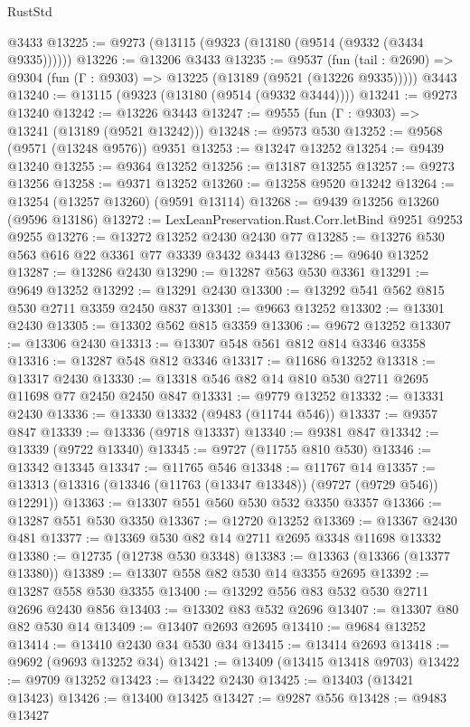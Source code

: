 \begin{lexlean}{RustStd}
\begin{coremodule}
{\begin{coremodule}
{{{{{{{{{{{{{{{{{{{{{{{{{{{{{{{{{{{{{{{{{{{{{{{{{{{{{{{    @3433
@13225 := @9273 (@13115 (@9323 (@13180 (@9514 (@9332 (@3434 @9335))))))
@13226 := @13206 @3433
@13235 := @9537
    (fun (tail : @2690) => @9304 (fun (Γ : @9303) => @13225 (@13189 (@9521 (@13226 @9335)))))
    @3443
@13240 := @13115 (@9323 (@13180 (@9514 (@9332 @3444))))
@13241 := @9273 @13240
@13242 := @13226 @3443
@13247 := @9555 (fun (Γ : @9303) => @13241 (@13189 (@9521 @13242)))
@13248 := @9573 @530
@13252 := @9568 (@9571 (@13248 @9576)) @9351
@13253 := @13247 @13252
@13254 := @9439 @13240
@13255 := @9364 @13252
@13256 := @13187 @13255
@13257 := @9273 @13256
@13258 := @9371 @13252
@13260 := @13258 @9520 @13242
@13264 := @13254 (@13257 @13260) (@9591 @13114)
@13268 := @9439 @13256 @13260 (@9596 @13186)
@13272 := LexLeanPreservation.Rust.Corr.letBind @9251 @9253 @9255
@13276 := @13272 @13252 @2430 @2430 @77
@13285 := @13276 @530 @563 @616 @22 @3361 @77 @3339 @3432 @3443
@13286 := @9640 @13252
@13287 := @13286 @2430
@13290 := @13287 @563 @530 @3361
@13291 := @9649 @13252
@13292 := @13291 @2430
@13300 := @13292 @541 @562 @815 @530 @2711 @3359 @2450 @837
@13301 := @9663 @13252
@13302 := @13301 @2430
@13305 := @13302 @562 @815 @3359
@13306 := @9672 @13252
@13307 := @13306 @2430
@13313 := @13307 @548 @561 @812 @814 @3346 @3358
@13316 := @13287 @548 @812 @3346
@13317 := @11686 @13252
@13318 := @13317 @2430
@13330 := @13318 @546 @82 @14 @810 @530 @2711 @2695 @11698 @77 @2450 @2450 @847
@13331 := @9779 @13252
@13332 := @13331 @2430
@13336 := @13330 @13332 (@9483 (@11744 @546))
@13337 := @9357 @847
@13339 := @13336 (@9718 @13337)
@13340 := @9381 @847
@13342 := @13339 (@9722 @13340)
@13345 := @9727 (@11755 @810 @530)
@13346 := @13342 @13345
@13347 := @11765 @546
@13348 := @11767 @14
@13357 := @13313 (@13316 (@13346 (@11763 (@13347 @13348)) (@9727 (@9729 @546)) @12291))
@13363 := @13307 @551 @560 @530 @532 @3350 @3357
@13366 := @13287 @551 @530 @3350
@13367 := @12720 @13252
@13369 := @13367 @2430 @481
@13377 := @13369 @530 @82 @14 @2711 @2695 @3348 @11698 @13332
@13380 := @12735 (@12738 @530 @3348)
@13383 := @13363 (@13366 (@13377 @13380))
@13389 := @13307 @558 @82 @530 @14 @3355 @2695
@13392 := @13287 @558 @530 @3355
@13400 := @13292 @556 @83 @532 @530 @2711 @2696 @2430 @856
@13403 := @13302 @83 @532 @2696
@13407 := @13307 @80 @82 @530 @14
@13409 := @13407 @2693 @2695
@13410 := @9684 @13252
@13414 := @13410 @2430 @34 @530 @34
@13415 := @13414 @2693
@13418 := @9692 (@9693 @13252 @34)
@13421 := @13409 (@13415 @13418 @9703)
@13422 := @9709 @13252
@13423 := @13422 @2430
@13425 := @13403 (@13421 @13423)
@13426 := @13400 @13425
@13427 := @9287 @556
@13428 := @9483 @13427
}}}}}}}}}}}}}}}}}}}}}}}}}}}}}}}}}}}}}}}}}}}}}}}}}}}}}}}
\end{coremodule}}
\end{coremodule}
\end{lexlean}
